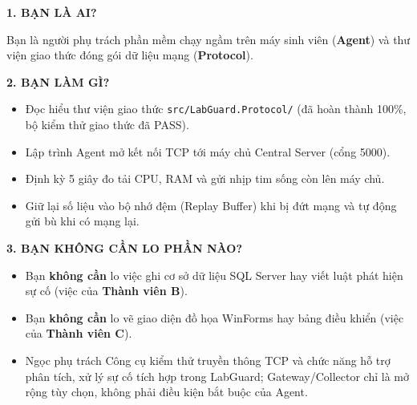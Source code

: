 \documentclass[12pt,a4paper]{article}
\begin{document}
\begin{tcolorbox}[enhanced, colback=lgLightTeal, colframe=lgTeal, boxrule=1pt, arc=2mm, top=2.5mm, bottom=2.5mm, left=3mm, right=3mm]
{\large\bfseries\color{lgTeal} 1. BẠN LÀ AI?}\par
\vspace{1mm}
Bạn là người phụ trách phần mềm chạy ngầm trên máy sinh viên (\textbf{Agent}) và thư viện giao thức đóng gói dữ liệu mạng (\textbf{Protocol}).
\end{tcolorbox}
\vspace{2mm}

\begin{tcolorbox}[enhanced, colback=lgLightBlue, colframe=lgDeepBlue, boxrule=1pt, arc=2mm, top=2.5mm, bottom=2.5mm, left=3mm, right=3mm]
{\large\bfseries\color{lgDeepBlue} 2. BẠN LÀM GÌ?}\par
\vspace{1mm}
\begin{itemize}[leftmargin=1.5em, itemsep=1pt, topsep=1pt]
  \item Đọc hiểu thư viện giao thức \texttt{src/LabGuard.Protocol/} (đã hoàn thành 100\%, bộ kiểm thử giao thức đã PASS).
  \item Lập trình Agent mở kết nối TCP tới máy chủ Central Server (cổng 5000).
  \item Định kỳ 5 giây đo tải CPU, RAM và gửi nhịp tim sống còn lên máy chủ.
  \item Giữ lại số liệu vào bộ nhớ đệm (Replay Buffer) khi bị đứt mạng và tự động gửi bù khi có mạng lại.
\end{itemize}
\end{tcolorbox}
\vspace{2mm}

\begin{tcolorbox}[enhanced, colback=lgLightRed, colframe=lgCrimson, boxrule=1pt, arc=2mm, top=2.5mm, bottom=2.5mm, left=3mm, right=3mm]
{\large\bfseries\color{lgCrimson} 3. BẠN KHÔNG CẦN LO PHẦN NÀO?}\par
\vspace{1mm}
\begin{itemize}[leftmargin=1.5em, itemsep=1pt, topsep=1pt]
  \item Bạn \textbf{không cần} lo việc ghi cơ sở dữ liệu SQL Server hay viết luật phát hiện sự cố (việc của \textbf{Thành viên B}).
  \item Bạn \textbf{không cần} lo vẽ giao diện đồ họa WinForms hay bảng điều khiển (việc của \textbf{Thành viên C}).
  \item Ngọc phụ trách Công cụ kiểm thử truyền thông TCP và chức năng hỗ trợ phân tích, xử lý sự cố tích hợp trong LabGuard; Gateway/Collector chỉ là mở rộng tùy chọn, không phải điều kiện bắt buộc của Agent.
\end{itemize}
\end{tcolorbox}
\vspace{2mm}
\end{document}
